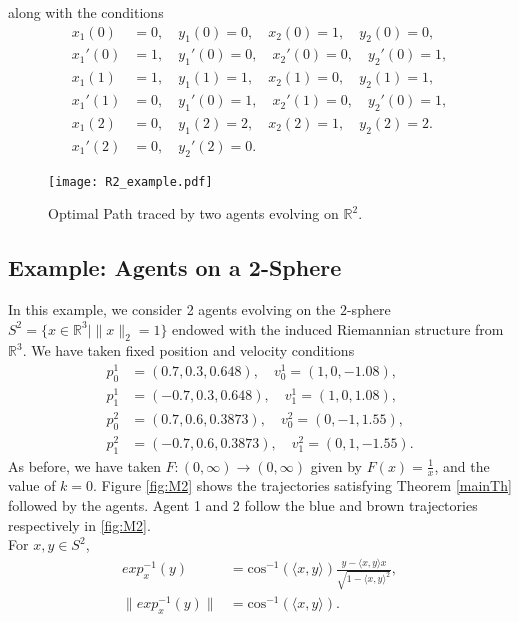 \documentclass[letterpaper, 10 pt, conference]{ieeeconf}  %
\newcommand{\R}{\mathbb{R}}
\begin{document}
along with the conditions
\begin{align*}
x_1(0) &= 0, \quad y_1(0) = 0,\quad x_2(0) = 1, \quad y_2(0) = 0, \\
x_1'(0) &= 1, \quad y_1'(0) = 0, \quad x_2'(0) = 0, \quad y_2'(0) = 1, \\
x_1(1) &= 1, \quad y_1(1) = 1, \quad x_2(1) = 0, \quad y_2(1) = 1, \\
x_1'(1) &= 0, \quad y_1'(0) = 1, \quad x_2'(1) = 0, \quad y_2'(0) = 1, \\
x_1(2) &= 0, \quad y_1(2) = 2, \quad x_2(2) = 1,\quad y_2(2) = 2. \\
x_1'(2) & = 0, \quad y_2'(2) = 0.     
\end{align*}

\begin{figure}
\centering
\texttt{[image: R2\_example.pdf]}
\caption{Optimal Path traced by two agents evolving on $\R^2$.} \label{fig:M1}
\end{figure}


\subsection{Example: Agents on a 2-Sphere}

In this example, we consider 2 agents evolving on the $2$-sphere $S^2 = \{x \in \mathbb{R}^3 \mid \|x\|_2 = 1\} $ endowed with the induced Riemannian structure from $\R^3$.  We have taken fixed position and velocity conditions 
\begin{align*}
p_0^1 &= (0.7, 0.3, 0.648), \quad v_0^1 = (1, 0, -1.08), \\
p_1^1 &= (-0.7, 0.3, 0.648), \quad v_1^1 = (1, 0, 1.08), \\
p_0^2 &= (0.7, 0.6, 0.3873), \quad v_0^2 = (0, -1, 1.55), \\
p_1^2 &= (-0.7, 0.6, 0.3873), \quad v_1^2 = (0, 1, -1.55). 
\end{align*}
 As before, we have taken $F : (0,\infty) \rightarrow (0,\infty)$ given by  $\displaystyle{F(x) = \frac{1}{x}}$, and the value of $k=0$. Figure \ref{fig:M2} shows the trajectories satisfying Theorem \ref{mainTh} followed by the agents. Agent 1 and 2 follow the blue and brown trajectories respectively in \ref{fig:M2}. \\
For $x, y \in S^2$, 
\begin{align*}
exp^{-1}_x(y) &= \text{cos}^{-1}(\langle x, y \rangle) \frac{y - \langle x, y\rangle x}{\sqrt{1 - \langle x, y\rangle^2}}, \\
\|exp^{-1}_x(y)\| &= \text{cos}^{-1}(\langle x, y \rangle).
\end{align*}
\end{document}
